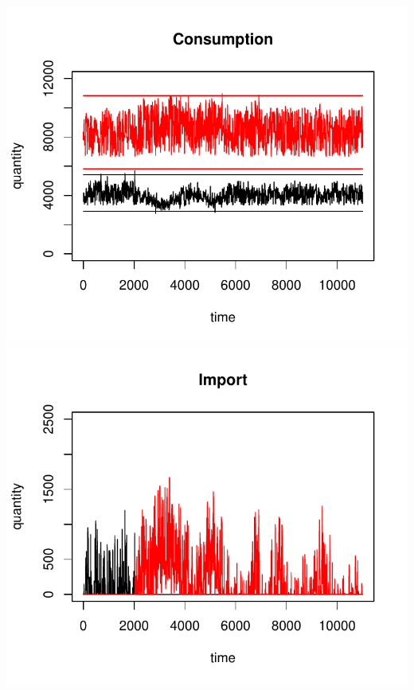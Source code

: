 \documentclass{article}
\begin{document}
\vskip2mm
\hskip-1cm
\includegraphics[scale=0.5]{fig_case05_consumption}
\includegraphics[scale=0.5]{fig_case05_import}
\end{document}
